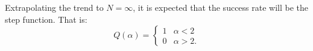
Extrapolating the trend to \(N=\infty\), it is expected that the success rate will be the step function.
That is:
\begin{equation} \label{eq:step}
	Q(\alpha) =
	\begin{cases}
	    1 & \alpha < 2\\
	    0 & \alpha > 2\text{.}
	\end{cases}
\end{equation}

